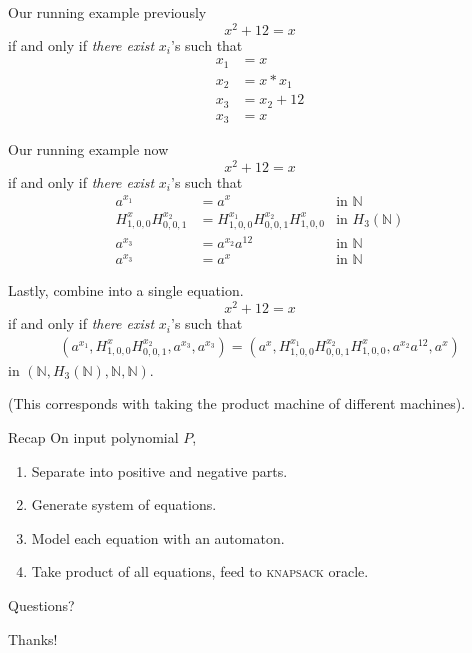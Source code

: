 \documentclass{beamer}
\begin{document}
\begin{frame}{Our running example previously}
  \[ x^2 + 12 = x \]
  if and only if \emph{there exist} $x_i$'s such that
  \begin{align*}
    x_1 &= x\\
    x_2 &= x * x_1\\
    x_3 &= x_2 + 12\\
    x_3 &= x
  \end{align*}
\end{frame}

\begin{frame}{Our running example now}
  \[ x^2 + 12 = x \]
  if and only if \emph{there exist} $x_i$'s such that
  \begin{align*}
    a^{x_1} &= a^x& \text{in $\mathbb{N}$}\\
    H^x_{1,0,0} H^{x_2}_{0,0,1} &= H^{x_1}_{1,0,0} H^{x_2}_{0,0,1} H^x_{1,0,0} & \text{in $H_3(\mathbb{N})$}\\
    a^{x_3} &= a^{x_2}a^{12}& \text{in $\mathbb{N}$}\\
    a^{x_3} &= a^{x}& \text{in $\mathbb{N}$}
  \end{align*}
\end{frame}

\begin{frame}{Lastly, combine into a single equation.}
  \[ x^2 + 12 = x \]
  if and only if \emph{there exist} $x_i$'s such that
  \begin{align*}
    (a^{x_1}, H^x_{1,0,0} H^{x_2}_{0,0,1}, a^{x_3}, a^{x_3}) = 
    (a^x, H^{x_1}_{1,0,0} H^{x_2}_{0,0,1} H^x_{1,0,0}, a^{x_2}a^{12}, a^{x})
  \end{align*}
  in $(\mathbb{N}, H_3(\mathbb{N}), \mathbb{N}, \mathbb{N})$.

  (This corresponds with taking the product machine of different
  machines).
\end{frame}

\begin{frame}{Recap}
  On input polynomial $P$,
  \begin{enumerate}
  \item Separate into positive and negative parts.
  \item Generate system of equations.
  \item Model each equation with an automaton.
  \item Take product of all equations, feed to \textsc{knapsack}
    oracle.
  \end{enumerate}
\end{frame}

\begin{frame}[standout]
  Questions?
\end{frame}

\begin{frame}[standout]
  Thanks!
\end{frame}
\end{document}
